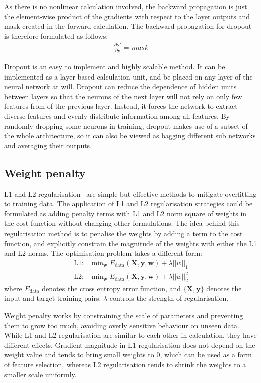\documentclass{article}
\begin{document}
As there is no nonlinear calculation involved, the backward propagation is just the element-wise product of the gradients with respect to the layer outputs and mask created in the forward calculation. 
The backward propagation for dropout is therefore formulated as follows:
\begin{align}
    \frac{\partial \bm{y}'}{\partial \bm{y}} = mask
\end{align}

Dropout is an easy to implement and highly scalable method. 
It can be implemented as a layer-based calculation unit, and be placed on any layer of the neural network at will. 
Dropout can reduce the dependence of hidden units between layers so that the neurons of the next layer will not rely on only few features from of the previous layer.
Instead, it forces the network to extract diverse features and evenly distribute information among all features. 
By randomly dropping some neurons in training, dropout makes use of a subset of the whole architecture, so it can also be viewed as bagging different sub networks and averaging their outputs.


\subsection{Weight penalty}

L1 and L2 regularisation~\cite{ng2004feature} are simple but effective methods to mitigate overfitting to training data. 
The application of L1 and L2 regularisation strategies could be formulated as adding penalty terms with L1 and L2 norm square of weights in the cost function without changing other formulations. 
The idea behind this regularisation method is to penalise the weights by adding a term to the cost function, and explicitly constrain the magnitude of the weights with either the L1 and L2 norms.
The optimisation problem takes a different form:
\begin{align}
    \text{L1: } & \text{min}_{\bm{w}} \; E_{\text{data}}(\bm{X}, \bm{y}, \bm{w}) + \lambda ||w||_1\\
    \text{L2: } & \text{min}_{\bm{w}} \; E_{\text{data}}(\bm{X}, \bm{y}, \bm{w}) + \lambda ||w||^2_2
\end{align}
where $E_{\text{data}}$ denotes the cross entropy error function, and $\{\bm{X}, \bm{y}\}$ denotes the input and target training pairs. 
$\lambda$ controls the strength of regularisation.

Weight penalty works by constraining the scale of parameters and preventing them to grow too much, avoiding overly sensitive behaviour on unseen data.
While L1 and L2 regularisation are similar to each other in calculation, they have different effects.
Gradient magnitude in L1 regularisation does not depend on the weight value and tends to bring small weights to 0, which can be used as a form of feature selection, whereas L2 regularisation tends to shrink the weights to a smaller scale uniformly. 
\end{document}
